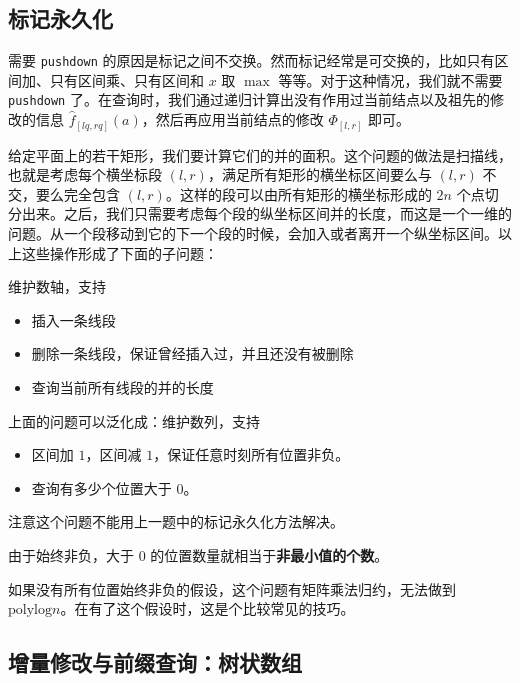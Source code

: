 \subsection{标记永久化}

需要 \texttt{pushdown} 的原因是标记之间不交换。然而标记经常是可交换的，比如只有区间加、只有区间乘、只有区间和 $x$ 取 $\max$ 等等。对于这种情况，我们就不需要 \texttt{pushdown} 了。在查询时，我们通过递归计算出没有作用过当前结点以及祖先的修改的信息 $\hat f_{[lq,rq]}(a)$，然后再应用当前结点的修改 $\Phi_{[l,r]}$ 即可。

\begin{example}[矩形面积并]
    给定平面上的若干矩形，我们要计算它们的并的面积。这个问题的做法是扫描线，也就是考虑每个横坐标段 $(l,r)$，满足所有矩形的横坐标区间要么与 $(l,r)$ 不交，要么完全包含 $(l,r)$。这样的段可以由所有矩形的横坐标形成的 $2n$ 个点切分出来。之后，我们只需要考虑每个段的纵坐标区间并的长度，而这是一个一维的问题。从一个段移动到它的下一个段的时候，会加入或者离开一个纵坐标区间。以上这些操作形成了下面的子问题：

    维护数轴，支持
    \begin{itemize}
        \item 插入一条线段
        \item 删除一条线段，保证曾经插入过，并且还没有被删除
        \item 查询当前所有线段的并的长度
    \end{itemize}
\end{example}

\begin{exercise}
    上面的问题可以泛化成：维护数列，支持
    \begin{itemize}
        \item 区间加 $1$，区间减 $1$，保证任意时刻所有位置非负。
        \item 查询有多少个位置大于 $0$。
    \end{itemize}
    注意这个问题不能用上一题中的标记永久化方法解决。
    \begin{hint}
        由于始终非负，大于 $0$ 的位置数量就相当于\textbf{非最小值的个数}。
    \end{hint}
\end{exercise}
\begin{remark}
    如果没有所有位置始终非负的假设，这个问题有矩阵乘法归约，无法做到 $\mathrm{polylog}n$。在有了这个假设时，这是个比较常见的技巧。
\end{remark}

\subsection{增量修改与前缀查询：树状数组}


